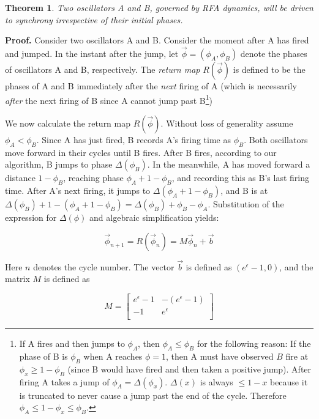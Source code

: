 \newtheorem{theorem}{Theorem}
\begin{theorem}
Two oscillators A and B, governed by RFA dynamics, will be driven to
synchrony irrespective of their initial phases.
\end{theorem}

{\bf Proof.} Consider two oscillators A and B. Consider the moment
after A has fired and jumped. In the instant after the jump, let
$\vec{\phi} = (\phi_A,\phi_B)$ denote the phases of oscillators A and
B, respectively. The {\em return map} $R(\vec{\phi})$ is defined to be
the phases of A and B immediately after the \emph{next} firing of A
(which is necessarily \emph{after} the next firing of B since A cannot
jump past B\footnote{If A fires and then jumps to $\phi_A$, then
$\phi_A \leq \phi_B$ for the following reason: If the phase of B is
$\phi_B$ when A reaches $\phi=1$, then A must have observed $B$ fire
at $\phi_x \geq 1 - \phi_B$ (since B would have fired and then taken a
positive jump). After firing A takes a jump of
$\phi_A=\Delta(\phi_x)$. $\Delta(x)$ is always $\leq 1-x$ because it
is truncated to never cause a jump past the end of the
cycle. Therefore $\phi_A \leq 1-\phi_x \leq \phi_B$.})

We now calculate the return map $R(\vec{\phi})$. Without loss of
generality assume $\phi_A < \phi_B$. Since A has just fired, B records
A's firing time as $\phi_B$. Both oscillators move forward in their
cycles until B fires. After B fires, according to our algorithm, B
jumps to phase $\Delta(\phi_B)$. In the meanwhile, A has moved forward
a distance $1-\phi_B$, reaching phase $\phi_A+1-\phi_B$, and recording
this as B's last firing time. After A's next firing, it jumps to
$\Delta(\phi_A+1-\phi_B)$, and B is at
$\Delta(\phi_B)+1-(\phi_A+1-\phi_B) =
\Delta(\phi_B)+\phi_B-\phi_A$. Substitution of the expression for
$\Delta(\phi)$ and algebraic simplification yields:

\begin{equation}\label{dynamics}
\vec{\phi}_{n+1}=R(\vec{\phi}_n)=M\vec{\phi}_n+\vec{b}
\end{equation}

Here $n$ denotes the cycle number. The vector $\vec{b}$ is defined as
  $(e^\epsilon-1,0)$, and the matrix $M$ is defined as


\begin{equation}\label{ADefn}
M=
\begin{bmatrix}
  e^\epsilon-1 & -(e^\epsilon-1) \\
  -1 & e^\epsilon \\
\end{bmatrix}
\end{equation}

